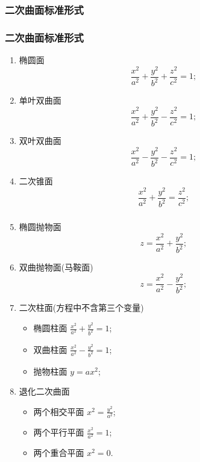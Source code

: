 \subsubsection{二次曲面标准形式}
\begin{frame}\frametitle{二次曲面标准形式}
\begin{enumerate}
\item 椭圆面
\[\frac{x^2}{a^2}+\frac{y^2}{b^2}+\frac{z^2}{c^2}=1;\]
\pp
\item 单叶双曲面
\[\frac{x^2}{a^2}+\frac{y^2}{b^2}-\frac{z^2}{c^2}=1;\]
\pp
\item 双叶双曲面
\[\frac{x^2}{a^2}-\frac{y^2}{b^2}-\frac{z^2}{c^2}=1;\]
\pp
\item 二次锥面
\[\frac{x^2}{a^2}+\frac{y^2}{b^2}=\frac{z^2}{c^2};\]
\end{enumerate}
\end{frame}






\begin{frame}\frametitle{}
\begin{enumerate}\setcounter{enumi}{4}
\item 椭圆抛物面
\[z=\frac{x^2}{a^2}+\frac{y^2}{b^2};\]
\pp
\item 双曲抛物面(马鞍面)
\[z=\frac{x^2}{a^2}-\frac{y^2}{b^2};\]
\pp
\item 二次柱面(方程中不含第三个变量)
\pp
\begin{itemize}
\item 椭圆柱面   $\frac{x^2}{a^2}+\frac{y^2}{b^2}=1$;
\pp
\item 双曲柱面   $\frac{x^2}{a^2}-\frac{y^2}{b^2}=1$;
\pp
\item 抛物柱面   $y=ax^2$;
\end{itemize}
\pp
\item 退化二次曲面
\pp
\begin{itemize}
\item 两个相交平面 $x^2=\frac{y^2}{a^2}$;
\pp
\item 两个平行平面 $\frac{x^2}{a^2}=1$;
\pp
\item 两个重合平面 $x^2=0$.
\end{itemize}
\end{enumerate}
\end{frame}






